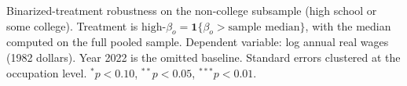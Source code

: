 \documentclass[11pt]{article}
\theoremstyle{plain}
\theoremstyle{remark}
\begin{document}
\begin{table}[H]
\begin{center}
\caption{Binarized-treatment robustness on the non-college subsample (high school or some college). Treatment is $\text{high-}\beta_o = \mathbf{1}\{\beta_o > \text{sample median}\}$, with the median computed on the full pooled sample. Dependent variable: log annual real wages (1982 dollars). Year 2022 is the omitted baseline. Standard errors clustered at the occupation level. $^{*}p<0.10$, $^{**}p<0.05$, $^{***}p<0.01$.}
\label{tab:lw_noncol_bin}
\resizebox{0.9\textwidth}{!}{}
\end{center}
\end{table}
\end{document}
